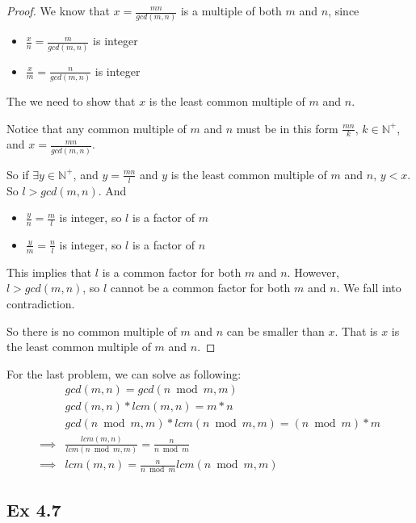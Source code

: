 \documentclass{article}
\begin{document}
\begin{proof}
    We know that $x = \frac{mn}{gcd(m, n)}$ is a multiple of both $m$ and $n$, since
    \begin{itemize}
        \item $\frac{x}{n} = \frac{m}{gcd(m, n)}$ is integer
        \item $\frac{x}{m} = \frac{n}{gcd(m, n)}$ is integer
    \end{itemize}
    The we need to show that $x$ is the least common multiple of $m$ and $n$.
    
    Notice that any common multiple of $m$ and $n$ must be in this form $\frac{mn}{k}$, $k \in \mathbb{N}^+$, and $x = \frac{mn}{gcd(m, n)}$.
    
    So if $\exists y \in \mathbb{N}^+$, and $y = \frac{mn}{l}$ and $y$ is the least common multiple of $m$ and $n$, $y < x$. So $l > gcd(m, n)$. And
    \begin{itemize}
        \item $\frac{y}{n} = \frac{m}{l}$ is integer, so $l$ is a factor of $m$
        \item $\frac{y}{m} = \frac{n}{l}$ is integer, so $l$ is a factor of $n$
    \end{itemize}
    This implies that $l$ is a common factor for both $m$ and $n$. However, $l > gcd(m,n)$, so $l$ cannot be a common factor for both $m$ and $n$. We fall into contradiction.
    
    So there is no common multiple of $m$ and $n$ can be smaller than $x$. That is $x$ is the least common multiple of $m$ and $n$.
    
\end{proof}

For the last problem, we can solve as following:
\begin{equation}
    \begin{split}
        & gcd(m, n) = gcd(n \bmod m, m)\\
        & gcd(m, n) * lcm(m, n) = m * n\\
        & gcd(n \bmod m, m) * lcm(n \bmod m, m) = (n \bmod m) * m\\
        \implies & \frac{lcm(m, n)}{lcm(n \bmod m, m)} = \frac{n}{n \bmod m}\\
        \implies & lcm(m, n) = \frac{n}{n \bmod m} lcm(n \bmod m, m)
    \end{split}
\end{equation}

\subsection{Ex 4.7}
\end{document}
